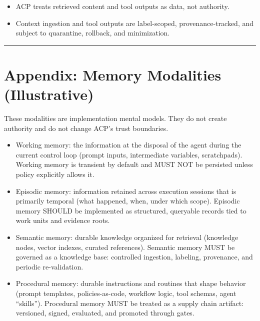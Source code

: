 \documentclass[11pt]{article}
\begin{document}
\begin{enumerate}
  \begin{itemize}
  \tightlist
  \item
    ACP treats retrieved content and tool outputs as data, not
    authority.
  \item
    Context ingestion and tool outputs are label-scoped,
    provenance-tracked, and subject to quarantine, rollback, and
    minimization.
  \end{itemize}
\end{enumerate}

\vspace{2pt}\begin{center}\rule{0.62\linewidth}{0.6pt}\end{center}\vspace{2pt}

\hypertarget{appendix-memory-modalities-illustrative}{%
\section{Appendix: Memory Modalities (Illustrative)}\label{appendix-memory-modalities-illustrative}}

These modalities are implementation mental models. They do not create
authority and do not change ACP's trust boundaries.

\begin{itemize}
\tightlist
\item
  Working memory: the information at the disposal of the agent during
  the current control loop (prompt inputs, intermediate variables,
  scratchpads). Working memory is transient by default and MUST NOT be
  persisted unless policy explicitly allows it.
\item
  Episodic memory: information retained across execution sessions that
  is primarily temporal (what happened, when, under which scope).
  Episodic memory SHOULD be implemented as structured, queryable records
  tied to work units and evidence roots.
\item
  Semantic memory: durable knowledge organized for retrieval (knowledge
  nodes, vector indexes, curated references). Semantic memory MUST be
  governed as a knowledge base: controlled ingestion, labeling,
  provenance, and periodic re-validation.
\item
  Procedural memory: durable instructions and routines that shape
  behavior (prompt templates, policies-as-code, workflow logic, tool
  schemas, agent ``skills''). Procedural memory MUST be treated as a
  supply chain artifact: versioned, signed, evaluated, and promoted
  through gates.
\end{itemize}
\end{document}
